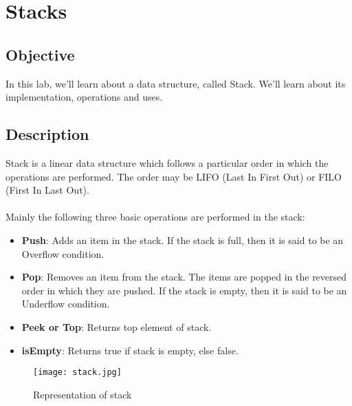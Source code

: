 \documentclass[11pt,fleqn]{book} %
\begin{document}


\pagestyle{empty} %

\tableofcontents %

\cleardoublepage %










\chapter{Stacks}
\section{Objective}
In this lab, we'll learn about a data structure, called Stack. We'll learn about its implementation, operations and uses.
\section{Description}
Stack is a linear data structure which follows a particular order in which the operations are performed. The order may be LIFO (Last In First Out) or FILO (First In Last Out).\\ ~\\
Mainly the following three basic operations are performed in the stack:
\begin{itemize}
\item \textbf{Push}: Adds an item in the stack. If the stack is full, then it is said to be an Overflow condition.
\item \textbf{Pop}: Removes an item from the stack. The items are popped in the reversed order in which they are pushed. If the stack is empty, then it is said to be an Underflow condition.
\item \textbf{Peek or Top}: Returns top element of stack.
\item \textbf{isEmpty}: Returns true if stack is empty, else false.
\end{itemize}
\begin{figure}[H]
	\centering
	\texttt{[image: stack.jpg]}
	\caption{Representation of stack}
\end{figure}
\newpage
\end{document}
